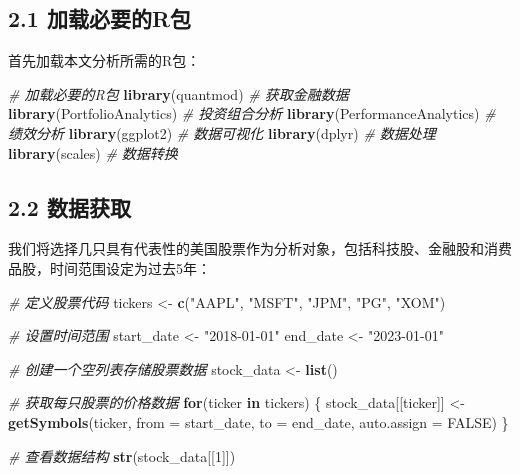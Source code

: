 \documentclass[
]{article}
\newenvironment{Shaded}{\begin{snugshade}}{\end{snugshade}}
\newcommand{\AttributeTok}[1]{\textcolor[rgb]{0.13,0.29,0.53}{#1}}
\newcommand{\CommentTok}[1]{\textcolor[rgb]{0.56,0.35,0.01}{\textit{#1}}}
\newcommand{\ConstantTok}[1]{\textcolor[rgb]{0.56,0.35,0.01}{#1}}
\newcommand{\ControlFlowTok}[1]{\textcolor[rgb]{0.13,0.29,0.53}{\textbf{#1}}}
\newcommand{\DecValTok}[1]{\textcolor[rgb]{0.00,0.00,0.81}{#1}}
\newcommand{\FunctionTok}[1]{\textcolor[rgb]{0.13,0.29,0.53}{\textbf{#1}}}
\newcommand{\NormalTok}[1]{#1}
\newcommand{\OtherTok}[1]{\textcolor[rgb]{0.56,0.35,0.01}{#1}}
\newcommand{\StringTok}[1]{\textcolor[rgb]{0.31,0.60,0.02}{#1}}
\begin{document}
\subsection{2.1
加载必要的R包}\label{ux52a0ux8f7dux5fc5ux8981ux7684rux5305}

首先加载本文分析所需的R包：

\begin{Shaded}
\begin{Highlighting}[]
\CommentTok{\# 加载必要的R包}
\FunctionTok{library}\NormalTok{(quantmod)      }\CommentTok{\# 获取金融数据}
\FunctionTok{library}\NormalTok{(PortfolioAnalytics)  }\CommentTok{\# 投资组合分析}
\FunctionTok{library}\NormalTok{(PerformanceAnalytics)  }\CommentTok{\# 绩效分析}
\FunctionTok{library}\NormalTok{(ggplot2)       }\CommentTok{\# 数据可视化}
\FunctionTok{library}\NormalTok{(dplyr)         }\CommentTok{\# 数据处理}
\FunctionTok{library}\NormalTok{(scales)        }\CommentTok{\# 数据转换}
\end{Highlighting}
\end{Shaded}

\subsection{2.2 数据获取}\label{ux6570ux636eux83b7ux53d6}

我们将选择几只具有代表性的美国股票作为分析对象，包括科技股、金融股和消费品股，时间范围设定为过去5年：

\begin{Shaded}
\begin{Highlighting}[]
\CommentTok{\# 定义股票代码}
\NormalTok{tickers }\OtherTok{\textless{}{-}} \FunctionTok{c}\NormalTok{(}\StringTok{"AAPL"}\NormalTok{, }\StringTok{"MSFT"}\NormalTok{, }\StringTok{"JPM"}\NormalTok{, }\StringTok{"PG"}\NormalTok{, }\StringTok{"XOM"}\NormalTok{)}

\CommentTok{\# 设置时间范围}
\NormalTok{start\_date }\OtherTok{\textless{}{-}} \StringTok{"2018{-}01{-}01"}
\NormalTok{end\_date }\OtherTok{\textless{}{-}} \StringTok{"2023{-}01{-}01"}

\CommentTok{\# 创建一个空列表存储股票数据}
\NormalTok{stock\_data }\OtherTok{\textless{}{-}} \FunctionTok{list}\NormalTok{()}

\CommentTok{\# 获取每只股票的价格数据}
\ControlFlowTok{for}\NormalTok{(ticker }\ControlFlowTok{in}\NormalTok{ tickers) \{}
\NormalTok{  stock\_data[[ticker]] }\OtherTok{\textless{}{-}} \FunctionTok{getSymbols}\NormalTok{(ticker, }\AttributeTok{from =}\NormalTok{ start\_date, }\AttributeTok{to =}\NormalTok{ end\_date, }\AttributeTok{auto.assign =} \ConstantTok{FALSE}\NormalTok{)}
\NormalTok{\}}

\CommentTok{\# 查看数据结构}
\FunctionTok{str}\NormalTok{(stock\_data[[}\DecValTok{1}\NormalTok{]])}
\end{Highlighting}
\end{Shaded}
\end{document}
